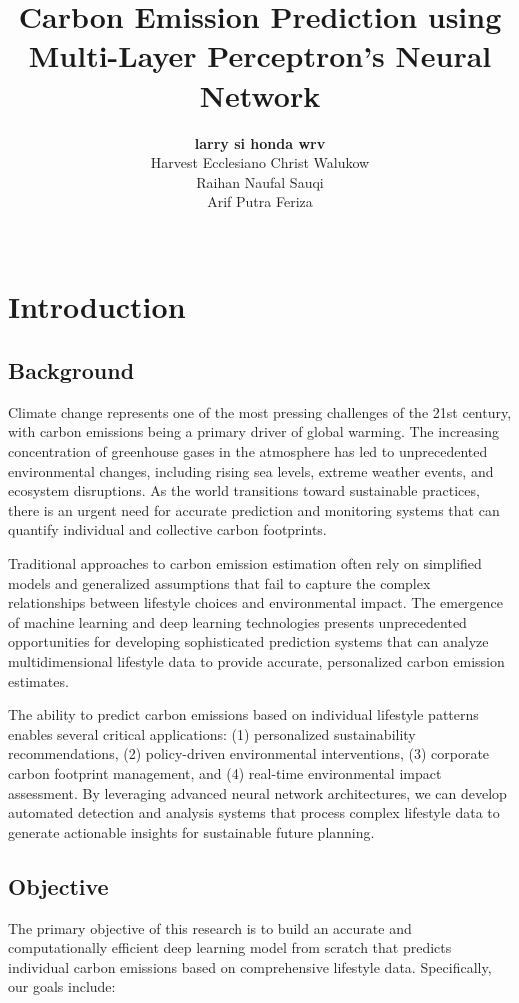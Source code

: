 \documentclass[12pt,a4paper]{article}
\title{\textbf{Carbon Emission Prediction using Multi-Layer Perceptron's Neural Network}}
\author{
\textbf{larry si honda wrv} \\   
Harvest Ecclesiano Christ Walukow \\
Raihan Naufal Sauqi \\
Arif Putra Feriza \\
\\
\vspace{3cm}
}
\begin{document}
\maketitle
\newpage
\tableofcontents
\newpage

\section{Introduction}

\subsection{Background}

Climate change represents one of the most pressing challenges of the 21st century, with carbon emissions being a primary driver of global warming. The increasing concentration of greenhouse gases in the atmosphere has led to unprecedented environmental changes, including rising sea levels, extreme weather events, and ecosystem disruptions. As the world transitions toward sustainable practices, there is an urgent need for accurate prediction and monitoring systems that can quantify individual and collective carbon footprints.

Traditional approaches to carbon emission estimation often rely on simplified models and generalized assumptions that fail to capture the complex relationships between lifestyle choices and environmental impact. The emergence of machine learning and deep learning technologies presents unprecedented opportunities for developing sophisticated prediction systems that can analyze multidimensional lifestyle data to provide accurate, personalized carbon emission estimates.

The ability to predict carbon emissions based on individual lifestyle patterns enables several critical applications: (1) personalized sustainability recommendations, (2) policy-driven environmental interventions, (3) corporate carbon footprint management, and (4) real-time environmental impact assessment. By leveraging advanced neural network architectures, we can develop automated detection and analysis systems that process complex lifestyle data to generate actionable insights for sustainable future planning.

\subsection{Objective}

The primary objective of this research is to build an accurate and computationally efficient deep learning model from scratch that predicts individual carbon emissions based on comprehensive lifestyle data. Specifically, our goals include:
\end{document}
